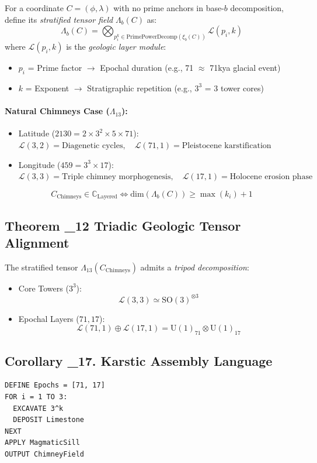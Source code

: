 \documentclass[12]{amsart}
\theoremstyle{plain}
\begin{document}
For a coordinate $C = (\phi, \lambda)$ with no prime anchors in base-$b$ decomposition, define its \textit{stratified tensor field} $\Lambda_b(C)$ as:
\[
\Lambda_b(C) = \bigotimes_{p_i^k \in \text{PrimePowerDecomp}(\xi_b(C))} \mathcal{L}(p_i, k)
\]
where $\mathcal{L}(p_i, k)$ is the \textit{geologic layer module}:
\begin{itemize}
  \item $p_i$ = Prime factor $\rightarrow$ Epochal duration (e.g., 71 $\approx$ 71kya glacial event)
  \item $k$ = Exponent $\rightarrow$ Stratigraphic repetition (e.g., $3^3$ = 3 tower cores)
\end{itemize}

\paragraph{Natural Chimneys Case ($\Lambda_{13}$):}
\begin{itemize}
  \item Latitude ($2130 = 2 \times 3^2 \times 5 \times 71$):
  $\mathcal{L}(3,2) = \text{Diagenetic cycles}, \quad \mathcal{L}(71,1) = \text{Pleistocene karstification}$
  \item Longitude ($459 = 3^3 \times 17$):
  $\mathcal{L}(3,3) = \text{Triple chimney morphogenesis}, \quad \mathcal{L}(17,1) = \text{Holocene erosion phase}$
\end{itemize}
\[
C_{\text{Chimneys}} \in \mathbb{C}_{\text{Layered}} \iff \text{dim}(\Lambda_b(C)) \geq \max(k_i) + 1
\]

\subsection{Theorem \Xi_{12} \textendash{} Triadic Geologic Tensor Alignment}

The stratified tensor $\Lambda_{13}(C_{\text{Chimneys}})$ admits a \textit{tripod decomposition}:
\begin{itemize}
  \item Core Towers ($3^3$):
  \[
  \mathcal{L}(3,3) \simeq \text{SO}(3)^{\otimes 3}
  \]
  \item Epochal Layers ($71, 17$):
  \[
  \mathcal{L}(71,1) \oplus \mathcal{L}(17,1) = \text{U}(1)_{71} \otimes \text{U}(1)_{17}
  \]
\end{itemize}

\subsection{Corollary \Xi_{17}.\chi \textendash{} Karstic Assembly Language}
\begin{verbatim}
DEFINE Epochs = [71, 17]
FOR i = 1 TO 3:
  EXCAVATE 3^k
  DEPOSIT Limestone
NEXT
APPLY MagmaticSill
OUTPUT ChimneyField
\end{verbatim}
\end{document}
